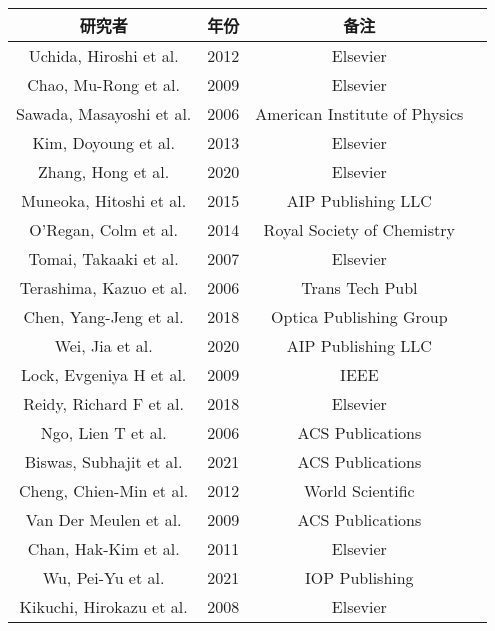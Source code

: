 \begin{center}
\begin{tabular}{cccc}
\hline
研究者 & 年份 & 备注 \\
\hline
Uchida, Hiroshi et al. \cite{uchida2012solubility} & 2012 & Elsevier \\
Chao, Mu-Rong et al. \cite{chao2009efficient} & 2009 & Elsevier \\
Sawada, Masayoshi et al. \cite{sawada2006micrometer} & 2006 & American Institute of Physics \\
Kim, Doyoung et al. \cite{kim2013ru} & 2013 & Elsevier \\
Zhang, Hong et al. \cite{zhang2020low} & 2020 & Elsevier \\
Muneoka, Hitoshi et al. \cite{stauss2015review} & 2015 & AIP Publishing LLC \\
O'Regan, Colm et al. \cite{o2014recent} & 2014 & Royal Society of Chemistry \\
Tomai, Takaaki et al. \cite{tomai2007carbon} & 2007 & Elsevier \\
Terashima, Kazuo et al. \cite{terashima2006microplasma} & 2006 & Trans Tech Publ \\
Chen, Yang-Jeng et al. \cite{chen2018supercritical} & 2018 & Optica Publishing Group \\
Wei, Jia et al. \cite{wei2020investigation} & 2020 & AIP Publishing LLC \\
Lock, Evgeniya H et al. \cite{lock2009influence} & 2009 & IEEE \\
Reidy, Richard F et al. \cite{reidy2018cryogenic} & 2018 & Elsevier \\
Ngo, Lien T et al. \cite{ngo2006ultimate} & 2006 & ACS Publications \\
Biswas, Subhajit et al. \cite{biswas2021stretching} & 2021 & ACS Publications \\
Cheng, Chien-Min et al. \cite{cheng2012improvement} & 2012 & World Scientific \\
Van Der Meulen et al. \cite{van2009single} & 2009 & ACS Publications \\
Chan, Hak-Kim et al. \cite{chan2011production} & 2011 & Elsevier \\
Wu, Pei-Yu et al. \cite{wu2021enhancing} & 2021 & IOP Publishing \\
Kikuchi, Hirokazu et al. \cite{kikuchi2008cu} & 2008 & Elsevier \\
\hline
\end{tabular}
\end{center}

